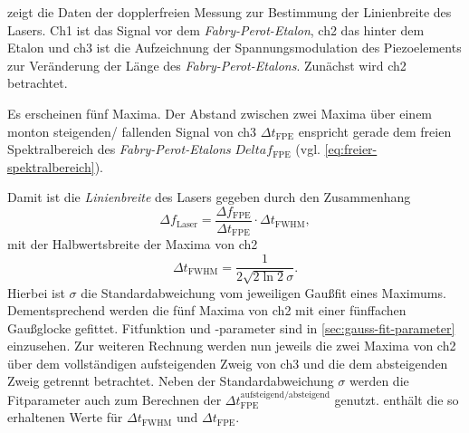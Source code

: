 \documentclass[../bericht.tex]{subfiles}
\begin{document}
         zeigt die Daten der dopplerfreien Messung zur Bestimmung der Linienbreite des Lasers. Ch1 ist das Signal vor dem \textit{Fabry-Perot-Etalon}, ch2 das hinter dem Etalon und ch3 ist die Aufzeichnung der Spannungsmodulation des Piezoelements zur Veränderung der Länge des \textit{Fabry-Perot-Etalons}. Zunächst wird ch2 betrachtet.

        Es erscheinen fünf Maxima. Der Abstand zwischen zwei Maxima über einem monton steigenden/ fallenden Signal von ch3 $\Delta t_\mathrm{FPE}$ enspricht gerade dem freien Spektralbereich des \textit{Fabry-Perot-Etalons} $Delta f_\mathrm{FPE}$ (vgl. \cref{eq:freier-spektralbereich}).

        Damit ist die \textit{Linienbreite} des Lasers gegeben durch den Zusammenhang
        \begin{equation}
          \Delta f_\mathrm{Laser} = \frac{\Delta f_\mathrm{FPE}}{\Delta t_\mathrm{FPE}}\cdot \Delta t_\mathrm{FWHM},
          \label{eq:deltaf-laser}
        \end{equation}
        mit der Halbwertsbreite der Maxima von ch2
        \begin{equation*}
          \Delta t_\mathrm{FWHM}=\frac{1}{2\sqrt{2\ln 2}\sigma}.
        \end{equation*}
        Hierbei ist $\sigma$ die Standardabweichung vom jeweiligen Gau\ss{}fit eines Maximums. Dementsprechend werden die fünf Maxima von ch2 mit einer fünffachen Gau\ss{}glocke gefittet. Fitfunktion und -parameter sind in \cref{sec:gauss-fit-parameter} einzusehen. Zur weiteren Rechnung werden nun jeweils die zwei Maxima von ch2 über dem vollständigen aufsteigenden Zweig von ch3 und die dem absteigenden Zweig getrennt betrachtet. Neben der Standardabweichung $\sigma$ werden die Fitparameter auch zum Berechnen der $\Delta t_\mathrm{FPE}^\mathrm{aufsteigend/absteigend}$ genutzt.  enthält die so erhaltenen Werte für $\Delta t_\mathrm{FWHM}$ und $\Delta t_\mathrm{FPE}$.
\end{document}
